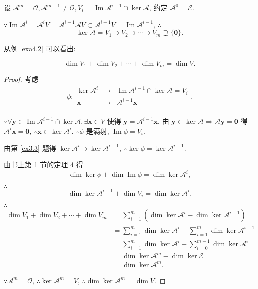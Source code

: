\documentclass{ctexart}
\begin{document}
设 $\mathcal{A}^m=\mathcal{O},\mathcal{A}^{m-1}\neq\mathcal{O},V_i=\operatorname{Im}\mathcal{A}^{i-1}\cap\ker\mathcal{A}$, 约定 $\mathcal{A}^0=\mathcal{E}$.

$\because\operatorname{Im}\mathcal{A}^i=\mathcal{A}^iV=\mathcal{A}^{i-1}\mathcal{A}V\subset\mathcal{A}^{i-1}V=\operatorname{Im}\mathcal{A}^{i-1}$, $\therefore$
\[\ker\mathcal{A}=V_1\supset V_2\supset\cdots\supset V_m\supsetneq\{\boldsymbol{0}\}.\]

从例 \ref{exa4.2} 可以看出:
\begin{lemma}\label{l4.1}
    \[\dim V_1+\dim V_2+\cdots+\dim V_m=\dim V.\]
\end{lemma}
\begin{proof}
    考虑
    \[\phi:\begin{array}{rcl}
        \ker\mathcal{A}^i & \to & \operatorname{Im}\mathcal{A}^{i-1}\cap\ker\mathcal{A}=V_i \\
        \boldsymbol{x} & \to & \mathcal{A}^{i-1}\boldsymbol{x} \\
    \end{array}.\]

    $\because\forall\boldsymbol{y}\in\operatorname{Im}\mathcal{A}^{i-1}\cap\ker\mathcal{A},\exists\boldsymbol{x}\in V$ 使得 $\boldsymbol{y}=\mathcal{A}^{i-1}\boldsymbol{x}$. 由 $\boldsymbol{y}\in\ker\mathcal{A}\Rightarrow\mathcal{A}\boldsymbol{y}=\boldsymbol{0}$ 得 $\mathcal{A}^i\boldsymbol{x}=\boldsymbol{0}$, $\therefore\boldsymbol{x}\in\ker\mathcal{A}^i$. $\therefore\phi$ 是满射, $\operatorname{Im}\phi=V_i$.

    由第 \ref{ex3.3} 题得 $\ker\mathcal{A}^i\supset\ker\mathcal{A}^{i-1}$, $\therefore\ker\phi=\ker\mathcal{A}^{i-1}$.

    由书上第 1 节的定理 4 得
    \[\dim\ker\phi+\dim\operatorname{Im}\phi=\dim\ker\mathcal{A}^i,\]

    $\therefore$
    \begin{equation}\label{eq4.6}
        \dim\ker\mathcal{A}^{i-1}+\dim V_i=\dim\ker\mathcal{A}^i.
    \end{equation}

    $\therefore$
    \begin{align*}
        \dim V_1+\dim V_2+\cdots+\dim V_m & =\sum\limits_{i=1}^m\left(\dim\ker\mathcal{A}^i-\dim\ker\mathcal{A}^{i-1}\right) \\
        & =\sum\limits_{i=1}^m\dim\ker\mathcal{A}^i-\sum\limits_{i=1}^m\dim\ker\mathcal{A}^{i-1} \\
        & =\sum\limits_{i=1}^m\dim\ker\mathcal{A}^i-\sum\limits_{i=0}^{m-1}\dim\ker\mathcal{A}^i \\
        & =\dim\ker\mathcal{A}^m-\dim\ker\mathcal{E} \\
        & =\dim\ker\mathcal{A}^m.
    \end{align*}

    $\because\mathcal{A}^m=\mathcal{O}$, $\therefore\ker\mathcal{A}^m=V$, $\therefore\dim\ker\mathcal{A}^m=\dim V$.
\end{proof}
\end{document}
